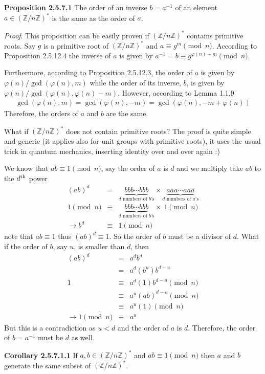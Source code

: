 \documentclass[aps,preprint,preprintnumbers,nofootinbib,showpacs,prd]{revtex4-1}
\newcommand{\nbea}{\begin{eqnarray*}}
\newcommand{\neea}{\end{eqnarray*}}
\begin{document}
{\bf Proposition 2.5.7.1} The order of an inverse $b = a^{-1}$ of an element $a \in (\mathbb{Z}/n\mathbb{Z})^*$ is the same as the order of $a$.

{\it Proof}. This proposition can be easily proven if $(\mathbb{Z}/n\mathbb{Z})^*$ contains primitive roots. Say $g$ is a primitive root of $(\mathbb{Z}/n\mathbb{Z})^*$ and $a \equiv g^m \pmod{n}$. According to Proposition 2.5.12.4 the inverse of $a$ is given by $a^{-1} = b \equiv g^{\varphi(n) - m} \pmod{n}$.

Furthermore, according to Proposition 2.5.12.3, the order of $a$ is given by $\varphi(n)/\gcd(\varphi(n), m)$ while the order of its inverse, $b$, is given by $\varphi(n)/\gcd(\varphi(n), \varphi(n) - m)$. However, according to Lemma 1.1.9
%
\nbea
\gcd(\varphi(n), m)  = \gcd(\varphi(n), -m) = \gcd(\varphi(n), - m + \varphi(n))
\neea
%
Therefore, the orders of $a$ and $b$ are the same.

What if $(\mathbb{Z}/n\mathbb{Z})^*$ does not contain primitive roots? The proof is quite simple and generic (it applies also for unit groups with primitive roots), it uses the usual trick in quantum mechanics, inserting identity over and over again :)

We know that $ab \equiv 1 \pmod{n}$, say the order of $a$ is $d$ and we multiply take $ab$ to the $d^{\rm th}$ power
%
\nbea
(ab)^d & = & \underbrace{bbb \cdots bbb}_\text{$d$ numbers of $b$'s} \times \underbrace{aaa \cdots aaa}_\text{$d$ numbers of $a$'s} \\
1 \pmod{n} & \equiv & \underbrace{bbb \cdots bbb}_\text{$d$ numbers of $b$'s} \times ~ 1 \pmod{n} \\
\to b^d & \equiv & 1 \pmod{n}
\neea
%
note that $ab \equiv 1$ thus $(ab)^d \equiv 1$. So the order of $b$ must be a divisor of $d$. What if the order of $b$, say $u$, is smaller than $d$, then
%
\nbea
(ab)^d & = & a^d b^d \\
& = & a^d (b^u) b^{d-u} \\
1 & \equiv & a^d (1) b^{d-u} \pmod{n} \\
& \equiv &  a^u (ab)^{d-u} \pmod{n} \\
& \equiv &  a^u (1) \pmod{n} \\
\to 1 \pmod{n} & \equiv & a^u
\neea
%
But this is a contradiction as $u < d$ and the order of $a$ is $d$. Therefore, the order of $b = a^{-1}$ must be $d$ as well.

{\bf Corollary 2.5.7.1.1} If $a, b \in (\mathbb{Z}/n\mathbb{Z})^*$ and $ab \equiv 1 \pmod{n}$ then $a$ and $b$ generate the same subset of $(\mathbb{Z}/n\mathbb{Z})^*$.
\end{document}
